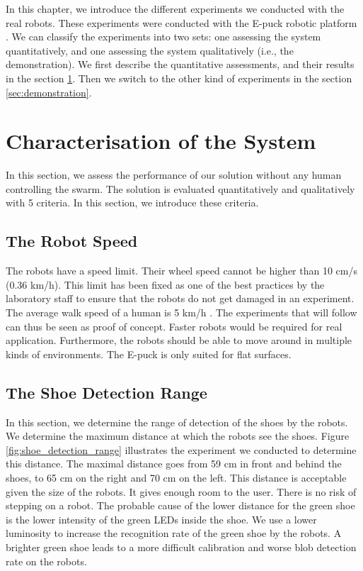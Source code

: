 \documentclass[oneside, a4paper, 12pt]{memoir}
\begin{document}
In this chapter, we introduce the different experiments we conducted with the real robots. These experiments were conducted with the E-puck robotic platform \citep{mondada2009puck}. We can classify the experiments into two sets: one assessing the system quantitatively, and one assessing the system qualitatively (i.e., the demonstration). We first describe the quantitative assessments, and their results in the section \ref{sec:characterisation_system}. Then we switch to the other kind of experiments in the section \ref{sec:demonstration}.

	\section{Characterisation of the System}
	\label{sec:characterisation_system}

	
	In this section, we assess the performance of our solution without any human controlling the swarm. The solution is evaluated quantitatively and qualitatively with 5 criteria. In this section, we introduce these criteria.
	
		\subsection{The Robot Speed}
			\label{sec:robot_speed}
			The robots have a speed limit. Their wheel speed cannot be higher than 10 cm/s (0.36 km/h). This limit has been fixed as one of the best practices by the laboratory staff to ensure that the robots do not get damaged in an experiment. The average walk speed of a human is 5 km/h \citep{wiki:002}. The experiments that will follow can thus be seen as proof of concept. Faster robots would be required for real application. Furthermore, the robots should be able to move around in multiple kinds of environments. The E-puck \citep{mondada2009puck} is only suited for flat surfaces.
	
		\subsection{The Shoe Detection Range}
		
			In this section, we determine the range of detection of the shoes by the robots. We determine the maximum distance at which the robots see the shoes. Figure \ref{fig:shoe_detection_range} illustrates the experiment we conducted to determine this distance. The maximal distance goes from 59 cm in front and behind the shoes, to 65 cm on the right and 70 cm on the left. This distance is acceptable given the size of the robots. It gives enough room to the user. There is no risk of stepping on a robot. The probable cause of the lower distance for the green shoe is the lower intensity of the green LEDs inside the shoe. We use a lower luminosity to increase the recognition rate of the green shoe by the robots. A brighter green shoe leads to a more difficult calibration and worse blob detection rate on the robots.
						
\end{document}
